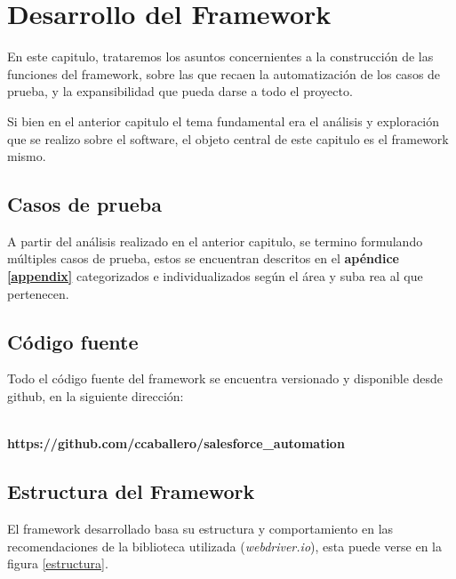 \chapter{Desarrollo del Framework}

En este capitulo, trataremos los asuntos concernientes a la construcción de las
funciones del framework, sobre las que recaen la automatización de los casos de
prueba, y la expansibilidad que pueda darse a todo el proyecto.

Si bien en el anterior capitulo el tema fundamental era el análisis y
exploración que se realizo sobre el software, el objeto central de este
capitulo es el framework mismo.

\section{Casos de prueba}
A partir del análisis realizado en el anterior capitulo, se termino formulando
múltiples casos de prueba, estos se encuentran descritos en el \textbf{apéndice
\ref{appendix}} categorizados e individualizados según el área y suba rea al que
pertenecen.

\section{Código fuente}
Todo el código fuente del framework se encuentra versionado y disponible desde
github, en la siguiente dirección:
\\
\\
\centerline{\textbf{https://github.com/ccaballero/salesforce\_automation}}

\section{Estructura del Framework}
El framework desarrollado basa su estructura y comportamiento en las
recomendaciones de la biblioteca utilizada (\emph{webdriver.io}), esta puede
verse en la figura \ref{estructura}.

